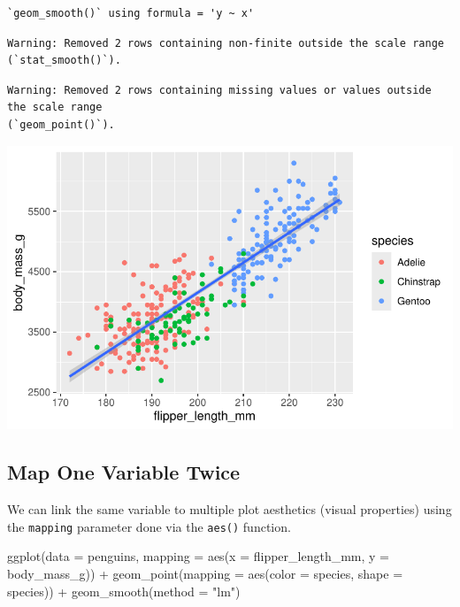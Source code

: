 \documentclass[
  letterpaper,
  DIV=11,
  numbers=noendperiod]{scrreprt}
\newenvironment{Shaded}{\begin{snugshade}}{\end{snugshade}}
\newcommand{\AttributeTok}[1]{\textcolor[rgb]{0.40,0.45,0.13}{#1}}
\newcommand{\FunctionTok}[1]{\textcolor[rgb]{0.28,0.35,0.67}{#1}}
\newcommand{\NormalTok}[1]{\textcolor[rgb]{0.00,0.23,0.31}{#1}}
\newcommand{\SpecialCharTok}[1]{\textcolor[rgb]{0.37,0.37,0.37}{#1}}
\newcommand{\StringTok}[1]{\textcolor[rgb]{0.13,0.47,0.30}{#1}}
\begin{document}
\begin{verbatim}
`geom_smooth()` using formula = 'y ~ x'
\end{verbatim}

\begin{verbatim}
Warning: Removed 2 rows containing non-finite outside the scale range
(`stat_smooth()`).
\end{verbatim}

\begin{verbatim}
Warning: Removed 2 rows containing missing values or values outside the scale range
(`geom_point()`).
\end{verbatim}

\includegraphics{src/r-for-data-science/01-data-viz_files/figure-pdf/unnamed-chunk-13-1.pdf}

\subsection{Map One Variable Twice}\label{map-one-variable-twice}

We can link the same variable to multiple plot aesthetics (visual
properties) using the \texttt{mapping} parameter done via the
\texttt{aes()} function.

\begin{Shaded}
\begin{Highlighting}[]
\FunctionTok{ggplot}\NormalTok{(}\AttributeTok{data =}\NormalTok{ penguins,}
       \AttributeTok{mapping =} \FunctionTok{aes}\NormalTok{(}\AttributeTok{x =}\NormalTok{ flipper\_length\_mm, }\AttributeTok{y =}\NormalTok{ body\_mass\_g)) }\SpecialCharTok{+}
  \FunctionTok{geom\_point}\NormalTok{(}\AttributeTok{mapping =} \FunctionTok{aes}\NormalTok{(}\AttributeTok{color =}\NormalTok{ species, }\AttributeTok{shape =}\NormalTok{ species)) }\SpecialCharTok{+}
  \FunctionTok{geom\_smooth}\NormalTok{(}\AttributeTok{method =} \StringTok{"lm"}\NormalTok{)}
\end{Highlighting}
\end{Shaded}
\end{document}
